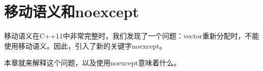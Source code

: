 \chapter{移动语义和noexcept}
移动语义在C++11中非常完整时，我们发现了一个问题：vector重新分配时，不能使用移动语义。因此，引入了新的关键字noexcept。

本章就来解释这个问题，以及使用noexcept意味着什么。





